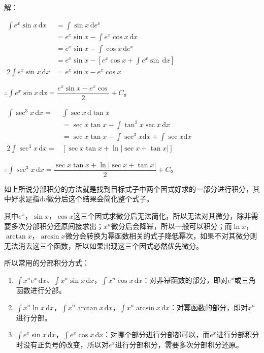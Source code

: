 \documentclass[UTF8, 12pt]{ctexart}
\begin{document}
        解：

        $
        \begin{aligned}
            \int e^x\sin x\,\textrm{d}x & =\int\sin x\,\textrm{d}e^x \\
            & =e^x\sin x-\int e^x\cos x\,\textrm{d}x \\
            & =e^x\sin x-\int\cos x\,\textrm{d}e^x \\
            & =e^x\sin x-\left[e^x\cos x+\int e^x\sin\,\textrm{d}x\right] \\
            2\int e^x\sin x\,\textrm{d}x & =e^x\sin x-e^x\cos x
        \end{aligned}
        $

        $\therefore\int e^x\sin x\,\textrm{d}x=\dfrac{e^x\sin x-e^x\cos}{2}+C$。

        $
        \begin{aligned}
            \int\sec^3x\,\textrm{d}x =&\int\sec x\,\textrm{d}\tan x \\
            & =\sec x\tan x-\int\tan^2x\sec x\,\textrm{d}x \\
            & =\sec x\tan x-\int\sec^3x\textrm{d}x+\int\sec x\textrm{d}x \\
            2\int\sec^3x\,\textrm{d}x =&[\sec x\tan x+\ln\vert\sec x+\tan x\vert]
        \end{aligned}
        $

        $\therefore\int\sec^3x\,\textrm{d}x =\dfrac{\sec x\tan x+\ln\vert\sec x+\tan x\vert}{2}+C$。

        如上所说分部积分的方法就是找到目标式子中两个因式好求的一部分进行积分，其中好求是指$\textrm{d}v$微分后这个结果会简化整个式子。

        其中$e^x$，$\sin x$，$\cos x$这三个因式求微分后无法简化，所以无法对其微分，除非需要多次分部积分还原间接求出；$x^n$微分后会降幂，所以一般可以积分；而$\ln x$，$\arctan x$，$\arcsin x$微分会转换为幂函数相关的式子降低幂次，如果不对其微分则无法消去这三个函数，所以如果出现这三个因式必然优先微分。

        所以常用的分部积分方式：

        \begin{enumerate}
            \item $\int x^ne^x\,\textrm{d}x$、$\int x^n\sin x\,\textrm{d}x$，$\int x^n\cos x\,\textrm{d}x$：对非幂函数的部分，即对$e^x$或三角函数进行分部。
            \item $\int x^n\ln x\,\textrm{d}x$，$\int x^n\arctan x\,\textrm{d}x$，$\int x^n\arcsin x\,\textrm{d}x$：对幂函数的部分，即对$x^n$进行分部。
            \item $\int e^x\sin x\,\textrm{d}x$，$\int e^x\cos x\,\textrm{d}x$：对哪个部分进行分部都可以，而$e^x$进行分部积分时没有正负号的改变，所以对$e^x$进行分部积分，需要多次分部积分还原。
        \end{enumerate}
\end{document}
